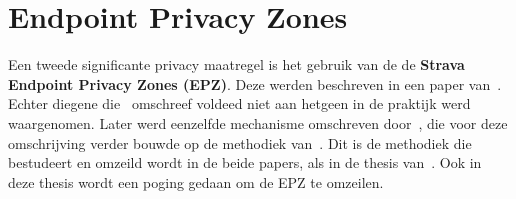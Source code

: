 \section{Endpoint Privacy Zones}\label{EPZ}
Een tweede significante privacy maatregel is het gebruik van de de
\textbf{Strava Endpoint Privacy Zones (EPZ)}. Deze werden beschreven in een
paper van~\citeauthor{sec18has3:online}. Echter diegene
die~\citeauthor{sec18has3:online} omschreef voldeed niet aan hetgeen in de
praktijk werd waargenomen. Later werd eenzelfde mechanisme omschreven
door~\citeauthor{Dhondt_Pochat_Voulimeneas_Joosen_Volckaert_2022}, die voor
deze omschrijving verder bouwde op de methodiek
van~\citeauthor{sec18has3:online}. Dit is de methodiek die bestudeert en
omzeild wordt in de beide papers, als in de thesis
van~\citeauthor{Verdonck_2022}. Ook in deze thesis wordt een poging gedaan om
de EPZ te omzeilen.

